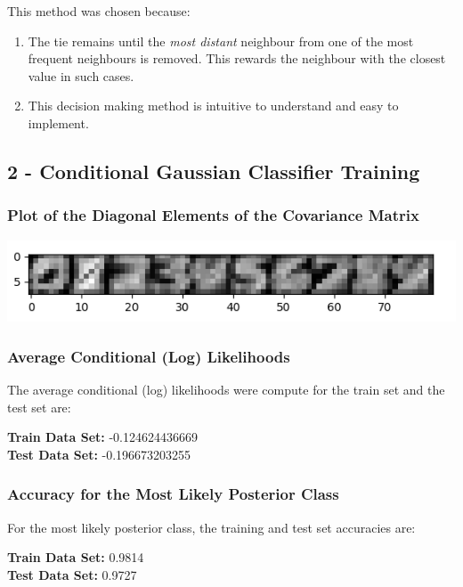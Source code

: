 \documentclass[10pt]{article}
\begin{document}
This method was chosen because: 
\begin{enumerate}
\item The tie remains until the \textit{most distant} neighbour from one of the most frequent neighbours is removed. This rewards the neighbour with the closest value in such cases.
\item This decision making method is intuitive to understand and easy to implement.
\end{enumerate}

\subsection{2 -  Conditional Gaussian Classifier Training}

\subsubsection{Plot of the Diagonal Elements of the Covariance Matrix}

\begin{center}
\includegraphics[scale=1]{covariances.png}
\end{center}

\subsubsection{Average Conditional (Log) Likelihoods}

The average conditional (log) likelihoods were compute for the train set and the test set are:
\begin{center}
\textbf{Train Data Set: } -0.124624436669
\\
\textbf{Test Data Set: } -0.196673203255
\end{center}

\subsubsection{Accuracy for the Most Likely Posterior Class}

For the most likely posterior class, the training and test set accuracies are: 
\begin{center}
\textbf{Train Data Set: } 0.9814
\\
\textbf{Test Data Set: } 0.9727
\end{center}
\end{document}
